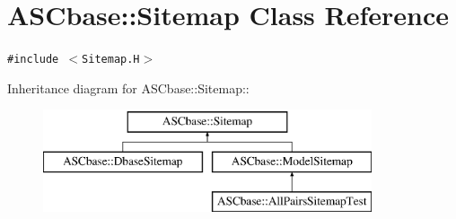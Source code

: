 \section{ASCbase::Sitemap Class Reference}
\label{classASCbase_1_1Sitemap}
{\tt \#include $<$Sitemap.H$>$}

Inheritance diagram for ASCbase::Sitemap::\begin{figure}[H]
\begin{center}
\leavevmode
\includegraphics[height=3cm]{classASCbase_1_1Sitemap}
\end{center}
\end{figure}

